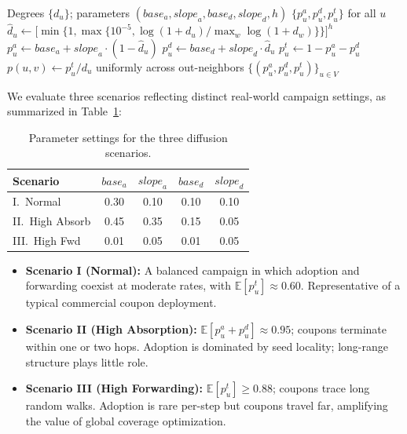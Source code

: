 \documentclass[sigconf]{acmart}
\newcommand{\E}{\mathbb{E}}
\begin{document}
\begin{algorithm}[t]
\caption{Degree-Based Node Probability Generation}
\label{alg:gendist}
\begin{algorithmic}[1]
\Require Degrees $\{d_u\}$; parameters
  $(\mathit{base}_a, \mathit{slope}_a, \mathit{base}_d,
    \mathit{slope}_d, h)$
\Ensure $\{p_u^a, p_u^d, p_u^t\}$ for all $u$
  \State $\hat{d}_u \gets
    \bigl[\min\{1,\max\{10^{-5},
    \log(1{+}d_u)/\max_w\log(1{+}d_w)\}\}\bigr]^h$
\EndFor
{}
  \State $p_u^a \gets \mathit{base}_a
    + \mathit{slope}_a \cdot (1-\hat{d}_u)$
  \State $p_u^d \gets \mathit{base}_d
    + \mathit{slope}_d \cdot \hat{d}_u$
  \State $p_u^t \gets 1 - p_u^a - p_u^d$
\EndFor
\State $p(u,v) \gets p_u^t / d_u$ uniformly across out-neighbors
\State \Return $\{(p_u^a, p_u^d, p_u^t)\}_{u\in V}$
\end{algorithmic}
\end{algorithm}

We evaluate three scenarios reflecting distinct real-world campaign
settings, as summarized in Table~\ref{tab:scenarios}:

\begin{table}[t]
  \caption{Parameter settings for the three diffusion scenarios.}
  \label{tab:scenarios}
  \centering
  \begin{tabular}{lcccc}
    \toprule
    Scenario & $\mathit{base}_a$ & $\mathit{slope}_a$ &
              $\mathit{base}_d$ & $\mathit{slope}_d$ \\
    \midrule
    I.\ Normal       & 0.30 & 0.10 & 0.10 & 0.10 \\
    II.\ High Absorb & 0.45 & 0.35 & 0.15 & 0.05 \\
    III.\ High Fwd   & 0.01 & 0.05 & 0.01 & 0.05 \\
    \bottomrule
  \end{tabular}
\end{table}

\begin{itemize}[leftmargin=*]
  \item \textbf{Scenario I (Normal):}
    A balanced campaign in which adoption and forwarding coexist at
    moderate rates, with $\E[p_u^t] \approx 0.60$.
    Representative of a typical commercial coupon deployment.
  \item \textbf{Scenario II (High Absorption):}
    $\E[p_u^a + p_u^d] \approx 0.95$; coupons terminate within
    one or two hops.
    Adoption is dominated by seed locality; long-range structure
    plays little role.
  \item \textbf{Scenario III (High Forwarding):}
    $\E[p_u^t] \geq 0.88$; coupons trace long random walks.
    Adoption is rare per-step but coupons travel far, amplifying
    the value of global coverage optimization.
\end{itemize}
\end{document}
